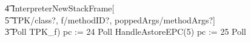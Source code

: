 \begin{figure}[t!]
\begin{circus}
    \t4 \lschexpract InterpreterNewStackFrame[\\
    \t5 TPK/class?, f/methodID?, poppedArgs/methodArgs?] \rschexpract \circseq \\
    \t3 Poll \circseq TPK\_f) \circseq pc := 24 \circseq Poll \circseq HandleAstoreEPC(5) \circseq pc := 25 \circseq Poll \circseq \\

\end{circus}
\end{figure}
